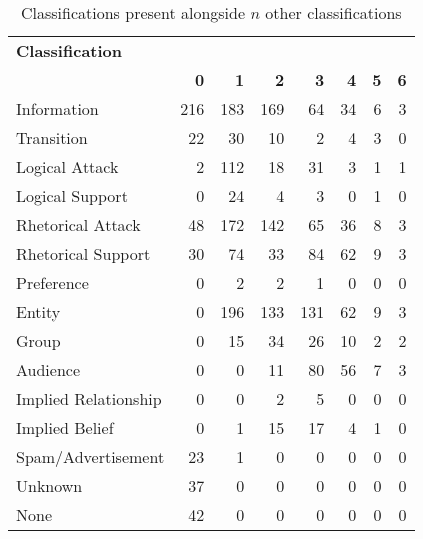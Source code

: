 \begin{table}
\centering
\caption{Classifications present alongside $n$ other classifications}
\label{table:case:other_annotations}
\begin{tabular}{ l | r | r | r | r | r | r | r }
\textbf{Classification} & \\
& \textbf{0} & \textbf{1} & \textbf{2} & \textbf{3} & \textbf{4} & \textbf{5} & \textbf{6} \\  
\hline
Information & 216 & 183 & 169 & 64 & 34 & 6 & 3 \\
Transition & 22 & 30 & 10 & 2 & 4 & 3 & 0 \\
Logical Attack & 2 & 112 & 18 & 31 & 3 & 1 & 1 \\
Logical Support & 0 & 24 & 4 & 3 & 0 & 1 & 0 \\
Rhetorical Attack & 48 & 172 & 142 & 65 & 36 & 8 & 3 \\
Rhetorical Support & 30 & 74 & 33 & 84 & 62 & 9 & 3 \\
Preference & 0 & 2 & 2 & 1 & 0 & 0 & 0 \\
Entity & 0 & 196 & 133 & 131 & 62 & 9 & 3 \\
Group & 0 & 15 & 34 & 26 & 10 & 2 & 2 \\
Audience & 0 & 0 & 11 & 80 & 56 & 7 & 3 \\
Implied Relationship & 0 & 0 & 2 & 5 & 0 & 0 & 0 \\
Implied Belief & 0 & 1 & 15 & 17 & 4 & 1 & 0 \\
Spam/Advertisement & 23 & 1 & 0 & 0 & 0 & 0 & 0 \\
Unknown & 37 & 0 & 0 & 0 & 0 & 0 & 0 \\
None & 42 & 0 & 0 & 0 & 0 & 0 & 0 \\
\end{tabular}
\end{table}


